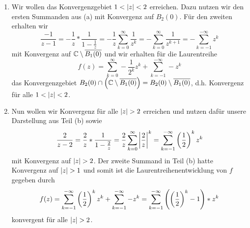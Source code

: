 \begin{exercisePage}
\begin{enumerate}[label=(zu \alph*), leftmargin=*]
		\item Wir wollen das Konvergenzgebiet $1 < \left| z \right| < 2$ erreichen. Dazu nutzen wir den ersten Summanden aus (a) mit Konvergenz auf $B_2(0)$. Für den zweiten erhalten wir
		\begin{equation*}
			\frac{-1}{z-1} = -\frac{1}{z} * \frac{1}{1 - \frac{1}{z}} = -\frac{1}{z} \sum_{k=0}^\infty \frac{1}{z^k} = - \sum_{k=0}^\infty \frac{1}{z^{k+1}} = - \sum_{k=-1}^{-\infty}	z^k	
		\end{equation*}
		mit Konvergenz auf $\mathbb{C} \setminus \overline{B_1(0)}$ und wir erhalten für die Laurentreihe 
		\begin{equation*}
			f(z) = \sum_{k=0}^\infty -\frac{1}{2^k} z^k + \sum_{k=-1}^{-\infty} -z^k
		\end{equation*}
		das Konvergenzgebiet $B_2(0) \cap \left( \mathbb{C} \setminus \overline{B_1(0)} \right) = B_2(0) \setminus \overline{B_1(0)}$, d.h. Konvergenz für alle $1 < \left| z \right| < 2$.
		
		\item Nun wollen wir Konvergenz für alle $\left| z \right| > 2$ erreichen und nutzen dafür unsere Darstellung aus Teil (b) sowie
		\begin{equation*}
			\frac{2}{z-2} = \frac{2}{z} * \frac{1}{1 - \frac{2}{z}} = \frac{2}{z} \sum_{k=0}^\infty \left| \frac 2 z \right|^k = \sum_{k=-1}^{-\infty} \left( \frac 1 2 \right)^k z^k
		\end{equation*}
		mit Konvergenz auf $\left| z \right| > 2$. Der zweite Summand in Teil (b) hatte Konvergenz auf $\left| z \right| > 1$ und somit ist die Laurentreihenentwicklung von $f$ gegeben durch
		\begin{equation*}
			f(z) = \sum_{k=-1}^{-\infty} \left( \frac 1 2 \right)^k z^k + \sum_{k=-1}^{-\infty} -z^k = \sum_{k=-1}^{-\infty} \left( \left( \frac 1 2 \right)^k - 1 \right) * z^k
		\end{equation*}
		konvergent für alle $\left| z \right| > 2$.
		

\end{enumerate}
\end{exercisePage}
